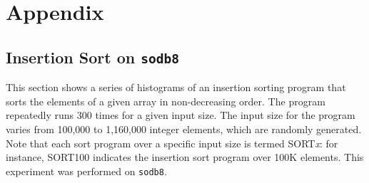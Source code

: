 \documentclass[10pt]{article}
\begin{document}
\newpage
\pagebreak

\section{Appendix}

\subsection{Insertion Sort on {\tt sodb8}~\label{sec:add_new}} 
This section shows a series of histograms of an insertion sorting program that 
sorts the elements of a given array in non-decreasing order. 
The program repeatedly runs 300 times for a given input size. 
The input size for the program 
varies from 100,000 to 1,160,000 integer elements, which are randomly generated. 
Note that each sort program over a specific input size is termed SORT{\it x}: 
for instance, SORT100 indicates the insertion sort program over 100K elements. 
This experiment was performed on {\tt sodb8}.
\end{document}
